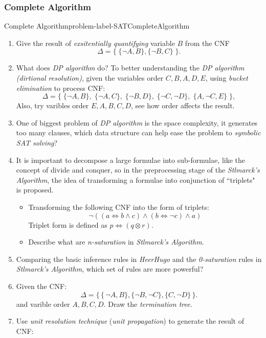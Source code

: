 \documentclass[main.tex]{subfiles}
\begin{document}
\subsubsection{Complete Algorithm}
\begin{problem}{Complete Algorithm}{problem-label-SATCompleteAlgorithm}
\begin{enumerate}[(1)]
    \item Give the result of \textit{exsitentially quantifying} variable $B$ from the CNF 
    \[
    \Delta=\{\;\{\neg A,B\},\{\neg B,C\}\;\}.
    \]
    \item What does \textit{DP algorithm} do? To better understanding the \textit{DP algorithm (dirtional resolution)}, given the variables order $C, B, A, D, E$, using \textit{bucket elimination} to process CNF:
    \[
    \Delta=\{\;\{\neg A,B\},\;\{\neg A,C\},\;\{\neg B,D\},\;\{\neg C,\neg D\},\;\{A,\neg C,E\}\;\},
    \]
    Also, try varibles order $E, A, B, C, D$, see how order affects the result.
    \item One of biggest problem of \textit{DP algorithm} is the space complexity, it generates too many clauses, which data structure can help ease the problem to \textit{symbolic SAT solving}?
    \item It is important to decompose a large formulae into sub-formulae, like the concept of divide and conquer, so in the preprocessing stage of the \textit{St\text{\aa}lmarck's Algorithm}, 
    the idea of transforming a formulae into conjunction of ``triplets" is proposed.
    \begin{itemize} 
        \item Transforming the following CNF into the form of triplets:
    \[
        \neg(({{a}}\Leftrightarrow b\wedge c)\wedge(b\Leftrightarrow\neg c)\wedge a)
    \]
    Triplet form is defined as $p\Leftrightarrow(q\otimes r)$.
    \item Describe what are \textit{n-saturation} in \textit{St\text{\aa}lmarck's Algorithm}.
    \end{itemize}
    \item Comparing the basic inference rules in \textit{HeerHugo} and the \textit{0-saturation} rules in \textit{St\text{\aa}lmarck's Algorithm}, which set of rules are more powerful?
    \item Given the CNF:
    \[
        \Delta=\{\,\{\,\neg A,B\},\{\neg B,\neg C\},\{C,\neg D\}\,\}.
    \]
    and varible order $A, B, C ,D$. Draw the \textit{termination tree}.
    \item Use \textit{unit resolution technique} (\textit{unit propagation}) to generate the result of CNF:

\end{enumerate}
\end{problem}
\end{document}
